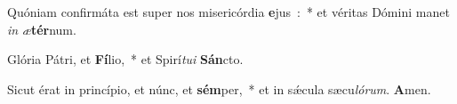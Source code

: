 ﻿\item Quóniam confirmáta est super nos misericórdia \textbf{e}jus~:~* et véritas Dómini manet \emph{in} \emph{æ}\textbf{tér}num.
\item Glória Pátri, et \textbf{Fí}\-lio,~* et Spirí\-\emph{tu}\emph{i} \textbf{Sán}cto.
\item Sicut érat in princípio, et núnc, et \textbf{sém}\-per,~* et in sǽcula sæcu\emph{ló}\-\emph{rum}. \textbf{A}men.